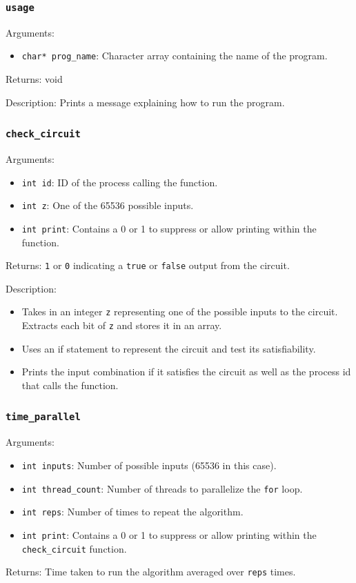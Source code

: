 \documentclass{article}
\begin{document}
\subsubsection{\texttt{usage}}
Arguments: 
    \begin{itemize}
	    \item \texttt{char* prog\_name}: Character array containing the name of the program.
    \end{itemize}
Returns: void

\medskip
\noindent
Description: Prints a message explaining how to run the program.

\subsubsection{\texttt{check\_circuit}}
Arguments: 
    \begin{itemize}
	    \item \texttt{int id}: ID of the process calling the function.
	    \item \texttt{int z}: One of the 65536 possible inputs.
        \item \texttt{int print}: Contains a 0 or 1 to suppress or allow printing within the function. 
    \end{itemize}
Returns: \texttt{1} or \texttt{0} indicating a \texttt{true} or \texttt{false} output from the circuit.

\medskip
\noindent
Description: 
\begin{itemize}
    \item Takes in an integer \texttt{z} representing one of the possible inputs to the circuit. Extracts each bit of \texttt{z} and stores it in an array.

    \item Uses an if statement to represent the circuit and test its satisfiability.

    \item Prints the input combination if it satisfies the circuit as well as the process id that calls the function.
\end{itemize}

\subsubsection{\texttt{time\_parallel}}
Arguments: 
    \begin{itemize}
	    \item \texttt{int inputs}: Number of possible inputs (65536 in this case).
	    \item \texttt{int thread\_count}: Number of threads to parallelize the \texttt{for} loop.
	    \item \texttt{int reps}: Number of times to repeat the algorithm.
        \item \texttt{int print}: Contains a 0 or 1 to suppress or allow printing within the \texttt{check\_circuit} function.
    \end{itemize}
Returns: Time taken to run the algorithm averaged over \texttt{reps} times.
\end{document}
